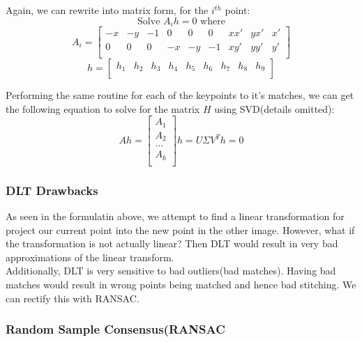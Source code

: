 \documentclass[12pt]{article}
\begin{document}
Again, we can rewrite into matrix form, for the $i^{th}$ point:
\begin{equation*}
\text{Solve } A_ih = 0 \text{ where}
\end{equation*}
\begin{equation*} A_i =
\begin{bmatrix}
-x & -y & -1 & 0 & 0& 0 & xx' & yx' & x' \\
0 & 0 & 0 & -x & -y& -1 & xy' & yy' & y' \\
\end{bmatrix}
\end{equation*}
\begin{equation*} h = 
\begin{bmatrix}
h_1 & h_2 & h_3 & h_4 & h_5 & h_6 & h_7 & h_8 & h_9 \\
\end{bmatrix}
\end{equation*}

Performing the same routine for each of the keypoints to it's matches, we can get the following equation to solve for the matrix $H$ using SVD(details omitted):
\begin{equation*}
Ah = \begin{bmatrix}
A_1\\
A_2 \\
...\\
A_k\\
\end{bmatrix} h = U\Sigma V^T h =0
\end{equation*}

\subsubsection{DLT Drawbacks}
As seen in the formulatin above, we attempt to find a linear transformation for project our current point into the new point in the other image. However, what if the transformation is not actually linear? Then DLT would result in very bad approximations of the linear transform.\\

Additionally, DLT is very sensitive to bad outliers(bad matches). Having bad matches would result in wrong points being matched and hence bad stitching. We can rectify this with RANSAC.

\subsubsection{Random Sample Consensus(RANSAC}
\end{document}
